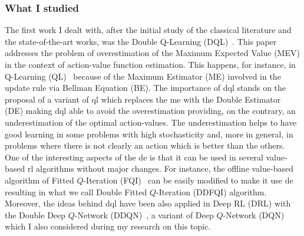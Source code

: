 \subsubsection{What I studied}
The first work I dealt with, after the initial study of the classical literature and the state-of-the-art works, was the Double Q-Learning (DQL)~\cite{van2010double}. This paper addresses the problem of overestimation of the Maximum Expected Value (MEV) in the context of action-value function estimation. This happens, for instance, in Q-Learning (QL)~\cite{smith2006optimizer} because of the Maximum Estimator (ME) involved in the update rule via Bellman Equation (BE). The importance of \gls{dql} stands on the proposal of a variant of \gls{ql} which replaces the \gls{me} with the Double Estimator (DE) making \gls{dql} able to avoid the overestimation providing, on the contrary, an underestimation of the optimal action-values. The underestimation helps to have good learning in some problems with high stochasticity and, more in general, in problems where there is not clearly an action which is better than the others. One of the interesting aspects of the \gls{de} is that it can be used in several value-based \gls{rl} algorithms without major changes. For instance, the offline value-based algorithm of Fitted $Q$-Iteration (FQI)~\cite{ernst2005tree} can be easily modified to make it use \gls{de} resulting in what we call Double Fitted $Q$-Iteration (DDFQI) algorithm. Moreover, the ideas behind \gls{dql} have been also applied in Deep RL (DRL) with the Double Deep $Q$-Network (DDQN)~\cite{hasselt2015double}, a variant of Deep $Q$-Network (DQN)~\cite{mnih2015human} which I also considered during my research on this topic.

